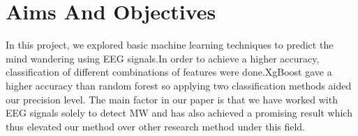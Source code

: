 \section{Aims And Objectives}

In this project, we explored basic machine learning techniques to predict the mind wandering using EEG signals.In order to achieve a higher accuracy, classification of different combinations of features were done.XgBoost gave a higher accuracy than random forest so applying two classification methods aided our precision level. The main factor in our paper is that we have worked with EEG signals solely to detect MW and has also achieved a promising result which thus elevated our method over other research method under this field.
